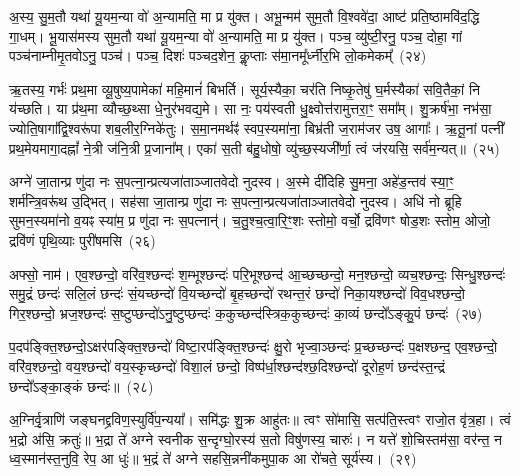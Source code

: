 अ॒स्य॒ सु॒म॒तौ यथा॑ यू॒यम॒न्या वो॑ अ॒न्यामति॒ मा प्र यु॑क्त। अभू॒न्मम॑ सुम॒तौ वि॒श्ववे॑दा॒ आष्ट॑ प्रति॒ष्ठामवि॑द॒द्धि गा॒धम्। भू॒यास॑मस्य सुम॒तौ यथा॑ यू॒यम॒न्या वो॑ अ॒न्यामति॒ मा प्र यु॑क्त। पञ्च॒ व्यु॑ष्टी॒रनु॒ पञ्च॒ दोहा॒ गां पञ्च॑नाम्नीमृ॒तवो\-ऽनु॒ पञ्च॑। पञ्च॒ दिशः॑ पञ्चद॒शेन॒ कॢ॒प्ताः स॑मा॒नमू᳚र्ध्नीर॒भि लो॒कमेकम्᳚~(२४)

ऋ॒तस्य॒ गर्भः॑ प्रथ॒मा व्यू॒षुष्य॒पामेका॑ महि॒मानं॑ बिभर्ति। सूर्य॒स्यैका॒ चर॑ति निष्कृ॒तेषु॑ घ॒र्मस्यैका॑ सवि॒तैकां॒ नि य॑च्छति। या प्र॑थ॒मा व्यौच्छ॒थ्सा धे॒नुर॑भवद्य॒मे। सा नः॒ पय॑स्वती धु॒क्ष्वोत्त॑रामुत्तरा॒ꣳ॒ समा᳚म्। शु॒क्रर्\mbox{}ष॑भा॒ नभ॑सा॒ ज्योति॒षागा᳚द्वि॒श्वरू॑पा शब॒लीर॒ग्निके॑तुः। स॒मा॒नमर्थꣴ॑ स्वप॒स्यमा॑ना॒ बिभ्र॑ती ज॒राम॑जर उष॒ आगाः᳚। ऋ॒तू॒नां पत्नी᳚ प्रथ॒मेयमागा॒दह्नां᳚ ने॒त्री ज॑नि॒त्री प्र॒जाना᳚म्। एका॑ स॒ती ब॑हु॒धोषो॒ व्यु॑च्छ॒स्यजी᳚र्णा॒ त्वं ज॑रयसि॒ सर्व॑म॒न्यत्॥~(२५)

{\anuvakamend[{ऊर्ज॒मेका᳚ प्रतिमु॒ञ्चमा॑ना भू॒यास॒मेकं॒ पत्न्येका॒न्नविꣳ॑श॒तिश्च॑}]}%

अग्ने॑ जा॒तान्प्र णु॑दा नः स॒पत्ना॒न्प्रत्यजा॑ताञ्जातवेदो नुदस्व। अ॒स्मे दी॑दिहि सु॒मना॒ अहे॑ड॒न्तव॑ स्या॒ꣳ॒ शर्म॑न्त्रि॒वरू॑थ उ॒द्भित्। सह॑सा जा॒तान्प्र णु॑दा नः स॒पत्ना॒न्प्रत्यजा॑ताञ्जातवेदो नुदस्व। अधि॑ नो ब्रूहि सुमन॒स्यमा॑नो व॒यꣴ स्या॑म॒ प्र णु॑दा नः स॒पत्नान्॑। च॒तु॒श्च॒त्वा॒रि॒ꣳ॒शः स्तोमो॒ वर्चो॒ द्रवि॑णꣳ षोड॒शः स्तोम॒ ओजो॒ द्रवि॑णं पृथि॒व्याः पुरी॑षमसि~(२६)

अफ्सो॒ नाम॑। एव॒श्छन्दो॒ वरि॑व॒श्छन्दः॑ श॒म्भूश्छन्दः॑ परि॒भूश्छन्द॑ आ॒च्छच्छन्दो॒ मन॒श्छन्दो॒ व्यच॒श्छन्दः॒ सिन्धु॒श्छन्दः॑ समु॒द्रं छन्दः॑ सलि॒लं छन्दः॑ सं॒यच्छन्दो॑ वि॒यच्छन्दो॑ बृ॒हच्छन्दो॑ रथन्त॒रं छन्दो॑ निका॒यश्छन्दो॑ विव॒धश्छन्दो॒ गिर॒श्छन्दो॒ भ्रज॒श्छन्दः॑ स॒ष्टुप्छन्दो॑\-ऽनु॒ष्टुप्छन्दः॑ क॒कुच्छन्द॑स्त्रिक॒कुच्छन्दः॑ का॒व्यं छन्दो᳚\-ऽङ्कु॒पं छन्दः॑~(२७)

प॒दप॑ङ्क्ति॒श्छन्दो॒\-ऽक्षर॑पङ्क्ति॒श्छन्दो॑ विष्टा॒रप॑ङ्क्ति॒श्छन्दः॑ क्षु॒रो भृज्वा॒ञ्छन्दः॑ प्र॒च्छच्छन्दः॑ प॒क्षश्छन्द॒ एव॒श्छन्दो॒ वरि॑व॒श्छन्दो॒ वय॒श्छन्दो॑ वय॒स्कृच्छन्दो॑ विशा॒लं छन्दो॒ विष्प॑र्धा॒श्छन्द॑श्छ॒दिश्छन्दो॑ दूरोह॒णं छन्द॑स्त॒न्द्रं छन्दो᳚\-ऽङ्का॒ङ्कं छन्दः॑॥~(२८)

{\anuvakamend[{अ॒स्य॒ङ्कु॒पञ्छन्द॒स्त्रय॑स्त्रिꣳशच्च}]}%

अ॒ग्निर्वृ॒त्राणि॑ जङ्घनद्द्रविण॒स्युर्वि॑प॒न्यया᳚। समि॑द्धः शु॒क्र आहु॑तः॥ त्वꣳ सो॑मासि॒ सत्प॑ति॒स्त्वꣳ राजो॒त वृ॑त्र॒हा। त्वं भ॒द्रो अ॑सि॒ क्रतुः॑॥ भ॒द्रा ते॑ अग्ने स्वनीक स॒न्दृग्घो॒रस्य॑ स॒तो विषु॑णस्य॒ चारुः॑। न यत्ते॑ शो॒चिस्तम॑सा॒ वर॑न्त॒ न ध्व॒स्मान॑स्त॒नुवि॒ रेप॒ आ धुः॑॥ भ॒द्रं ते॑ अग्ने सहसि॒न्ननी॑कमुपा॒क आ रो॑चते॒ सूर्य॑स्य।~(२९)

